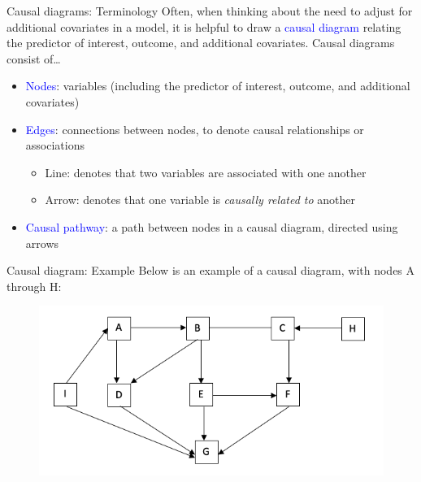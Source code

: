 \documentclass[10pt,t]{beamer}
\begin{document}
\begin{frame}{Causal diagrams: Terminology}
Often, when thinking about the need to adjust for additional covariates in a model, it is helpful to draw a \textcolor{blue}{causal diagram} relating the predictor of interest, outcome, and additional covariates. Causal diagrams consist of\dots

\vspace{0.3cm}

\begin{itemize}
	\item \textcolor{blue}{Nodes}: variables (including the predictor of interest, outcome, and additional covariates) \pause
	\item \textcolor{blue}{Edges}: connections between nodes, to denote causal relationships or associations \pause
	\begin{itemize}
		\item Line: denotes that two variables are associated with one another
		\item Arrow: denotes that one variable is \textit{causally related to} another
	\end{itemize} \pause
\item \textcolor{blue}{Causal pathway}: a path between nodes in a causal diagram, directed using arrows
\end{itemize}
\end{frame}

\begin{frame}{Causal diagram: Example}
Below is an example of a causal diagram, with nodes A through H:

\vspace{0.1cm}
\begin{figure}
	\centering \includegraphics[scale=0.4]{dag1.png}
\end{figure}

\end{frame}
\end{document}

